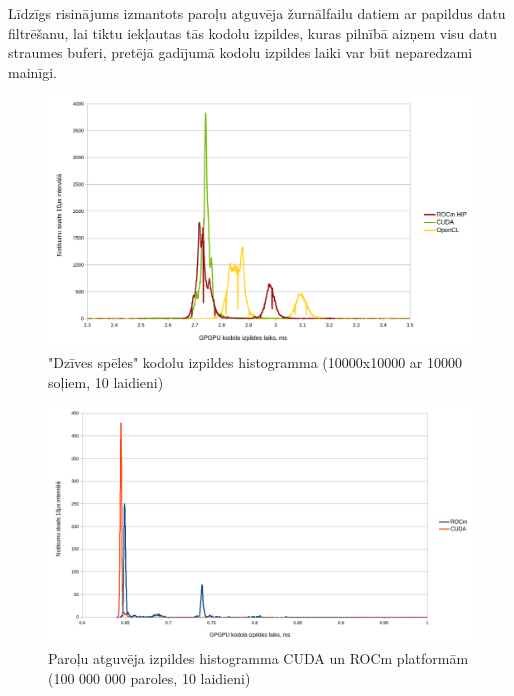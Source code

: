 Līdzīgs risinājums izmantots paroļu atguvēja žurnālfailu datiem ar papildus
datu filtrēšanu, lai tiktu iekļautas tās kodolu izpildes, kuras pilnībā aizņem
visu datu straumes buferi, pretējā gadījumā kodolu izpildes laiki var būt
neparedzami mainīgi.

\begin{figure}[H]
    \centering
    \includegraphics[width=\textwidth]{images/gol_distrib.png}
    \caption{"Dzīves spēles" kodolu izpildes histogramma (10000x10000 ar 10000 soļiem, 10 laidieni)}
    \label{img:gol_distrib}
\end{figure}


\begin{figure}[H] \centering
    \includegraphics[width=\textwidth]{images/sha_distrib_cuda_rocm.png}
    \caption{Paroļu atguvēja izpildes histogramma CUDA un ROCm platformām (100
    000 000 paroles, 10 laidieni)} \label{img:sha_distrib}
\end{figure}


